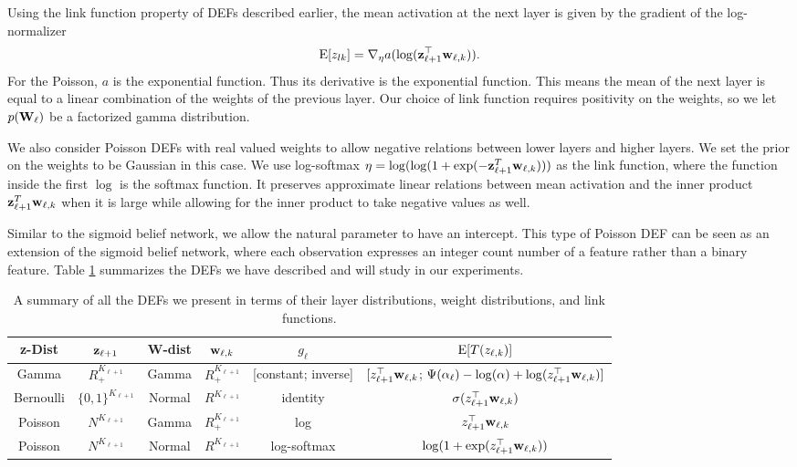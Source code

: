 \documentclass[twoside]{article}
\begin{document}
Using the link function property of DEFs described earlier, the mean activation
at the next layer is given by the gradient of the log-normalizer
\begin{align*}
\textrm{E}[z_{lk}] = \nabla_\eta a(\log(\boldsymbol{\mathbf{z}}_{\ell+1}^\top \boldsymbol{\mathbf{w}}_{\ell,k})).
\end{align*}
For the Poisson, $a$ is the exponential function. Thus its derivative is
the exponential function. This means the mean of the next layer is equal to
a linear combination of the weights of the previous layer. Our choice of link 
function requires positivity on the weights, so
we let $p(\boldsymbol{\mathbf{W}}_\ell)$ be a factorized gamma distribution.

We also consider Poisson DEFs with real valued weights to allow negative relations between lower layers and higher layers. 
We set the prior on the weights to be Gaussian in this case.
We use log-softmax $\eta=\log (\log (1+\exp(-\boldsymbol{\mathbf{z}}_{\ell+1}^T \boldsymbol{\mathbf{w}}_{\ell,k})))$ as the link function, where the function inside the first $\log$ is the softmax function. It preserves approximate linear relations between mean activation and the inner product $\boldsymbol{\mathbf{z}}_{\ell+1}^T \boldsymbol{\mathbf{w}}_{\ell,k}$ when it is large while allowing for the inner product to take negative values as well. 

Similar to the sigmoid belief network, we allow the natural parameter to have an intercept. This type of Poisson DEF can be seen as an extension of the sigmoid belief network,
where each observation expresses an integer count number of a feature rather than a binary feature. 
Table \ref{tab:dist-and-link} summarizes the DEFs we have described and will study in our experiments.

\begin{table}
\centering
\begin{tabular}{|c | c |c | c | c | c |}
\hline
z-Dist & $\boldsymbol{\mathbf{z}}_{\ell+1}$ & W-dist & $\boldsymbol{\mathbf{w}}_{\ell, k}$ & $g_\ell$ & $\textrm{E}[T(z_{\ell, k})]$ \\
\hline
Gamma & $R_+^{K_{\ell +1}} $ & Gamma & $R_+^{K_{\ell +1}}$ &  [constant; inverse] & $ [z_{\ell+1}^\top \boldsymbol{\mathbf{w}}_{\ell, k}$; $\Psi(\alpha_\ell) - \log (\alpha) + \log(z_{\ell+1}^\top \boldsymbol{\mathbf{w}}_{\ell, k})]$ \\
Bernoulli & $\{0, 1\}^{K_{\ell +1}}$ & Normal  & $R^{K_{\ell +1}}$ & identity & $\sigma(z_{\ell+1}^\top \boldsymbol{\mathbf{w}}_{\ell, k})$ \\
Poisson & $N^{K_{\ell +1}} $  & Gamma & $R_+^{K_{\ell +1}}$ &  log & $z_{\ell+1}^\top \boldsymbol{\mathbf{w}}_{\ell, k}$ \\
Poisson & $N^{K_{\ell +1}} $  & Normal & $R^{K_{\ell +1}}$ &  log-softmax & $\log( 1 + \exp(z_{\ell+1}^\top \boldsymbol{\mathbf{w}}_{\ell, k}))$ \\
\hline
\end{tabular}
\caption{
A summary of all the DEFs we present in terms of their layer distributions, weight distributions, and link functions.
}  \label{tab:dist-and-link}
\vskip -0.10in
\end{table}
\end{document}
